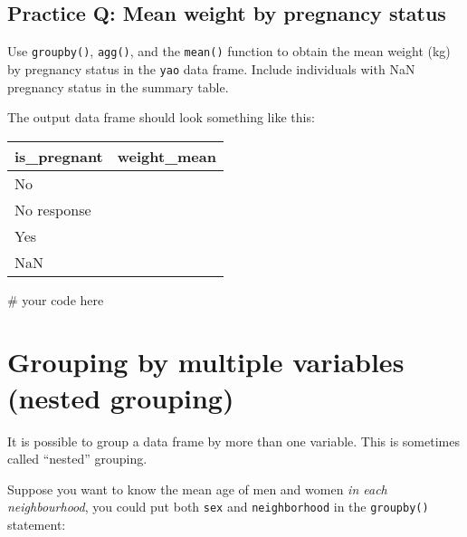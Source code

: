 \documentclass[
  letterpaper,
  DIV=11,
  numbers=noendperiod]{scrreprt}
\newenvironment{Shaded}{\begin{snugshade}}{\end{snugshade}}
\newcommand{\CommentTok}[1]{\textcolor[rgb]{0.37,0.37,0.37}{#1}}
\begin{document}
\begin{tcolorbox}[enhanced jigsaw, colframe=quarto-callout-tip-color-frame, opacityback=0, titlerule=0mm, bottomrule=.15mm, breakable, leftrule=.75mm, colbacktitle=quarto-callout-tip-color!10!white, title=\textcolor{quarto-callout-tip-color}{\faLightbulb}\hspace{0.5em}{Practice}, rightrule=.15mm, coltitle=black, opacitybacktitle=0.6, colback=white, left=2mm, arc=.35mm, toptitle=1mm, bottomtitle=1mm, toprule=.15mm]

\subsection{Practice Q: Mean weight by pregnancy
status}\label{practice-q-mean-weight-by-pregnancy-status}

Use \texttt{groupby()}, \texttt{agg()}, and the \texttt{mean()} function
to obtain the mean weight (kg) by pregnancy status in the \texttt{yao}
data frame. Include individuals with NaN pregnancy status in the summary
table.

The output data frame should look something like this:

\begin{longtable}[]{@{}ll@{}}
\toprule\noalign{}
is\_pregnant & weight\_mean \\
\midrule\noalign{}
\endhead
\bottomrule\noalign{}
\endlastfoot
No & \\
No response & \\
Yes & \\
NaN & \\
\end{longtable}

\begin{Shaded}
\begin{Highlighting}[]
\CommentTok{\# your code here}
\end{Highlighting}
\end{Shaded}

\end{tcolorbox}

\section{Grouping by multiple variables (nested
grouping)}\label{grouping-by-multiple-variables-nested-grouping}

It is possible to group a data frame by more than one variable. This is
sometimes called ``nested'' grouping.

Suppose you want to know the mean age of men and women \emph{in each
neighbourhood}, you could put both \texttt{sex} and
\texttt{neighborhood} in the \texttt{groupby()} statement:
\end{document}
